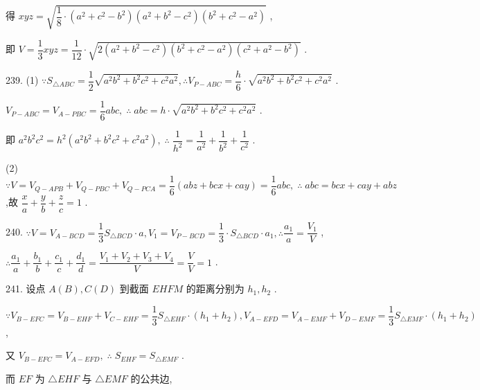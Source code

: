 得 ${xyz} = \sqrt{\dfrac{1}{8} \cdot  \left( {{a}^{2} + {c}^{2} - {b}^{2}}\right) \left( {{a}^{2} + {b}^{2} - {c}^{2}}\right) \left( {{b}^{2} + {c}^{2} - {a}^{2}}\right) }$ ,

即 $V = \dfrac{1}{3}{xyz} = \dfrac{1}{12} \cdot  \sqrt{2\left( {{a}^{2} + {b}^{2} - {c}^{2}}\right) \left( {{b}^{2} + {c}^{2} - {a}^{2}}\right) \left( {{c}^{2} + {a}^{2} - {b}^{2}}\right) }$ .

239. (1) $\because {S}_{\bigtriangleup {ABC}} = \dfrac{1}{2}\sqrt{{a}^{2}{b}^{2} + {b}^{2}{c}^{2} + {c}^{2}{a}^{2}},\therefore {V}_{P - {ABC}} = \dfrac{h}{6} \cdot  \sqrt{{a}^{2}{b}^{2} + {b}^{2}{c}^{2} + {c}^{2}{a}^{2}}$ .

${V}_{P - {ABC}} = {V}_{A - {PBC}} = \dfrac{1}{6}{abc},\;\therefore \;{abc} = h \cdot  \sqrt{{a}^{2}{b}^{2} + {b}^{2}{c}^{2} + {c}^{2}{a}^{2}}$ .

即 ${a}^{2}{b}^{2}{c}^{2} = {h}^{2}\left( {{a}^{2}{b}^{2} + {b}^{2}{c}^{2} + {c}^{2}{a}^{2}}\right) ,\;\therefore \;\dfrac{1}{{h}^{2}} = \dfrac{1}{{a}^{2}} + \dfrac{1}{{b}^{2}} + \dfrac{1}{{c}^{2}}$ .

(2) $\because V = {V}_{Q - {APB}} + {V}_{Q - {PBC}} + {V}_{Q - {PCA}} = \dfrac{1}{6}\left( {{abz} + {bcx} + {cay}}\right)  = \dfrac{1}{6}{abc},\;\therefore \;{abc} = {bcx} + {cay} + {abz}$ ,故 $\dfrac{x}{a} + \dfrac{y}{b} + \dfrac{z}{c} = 1$ .

240. $\because V = {V}_{A - {BCD}} = \dfrac{1}{3}{S}_{\bigtriangleup {BCD}} \cdot  a,{V}_{1} = {V}_{P - {BCD}} = \dfrac{1}{3} \cdot  {S}_{\bigtriangleup {BCD}} \cdot  {a}_{1},\therefore \dfrac{{a}_{1}}{a} = \dfrac{{V}_{1}}{V}$ ,

$\therefore \dfrac{{a}_{1}}{a} + \dfrac{{b}_{1}}{b} + \dfrac{{c}_{1}}{c} + \dfrac{{d}_{1}}{d} = \dfrac{{V}_{1} + {V}_{2} + {V}_{3} + {V}_{4}}{V} = \dfrac{V}{V} = 1$ .

241. 设点 $A\left( B\right) ,C\left( D\right)$ 到截面 ${EHFM}$ 的距离分别为 ${h}_{1},{h}_{2}$ .

$\because {V}_{B - {EFC}} = {V}_{B - {EHF}} + {V}_{C - {EHF}} = \dfrac{1}{3}{S}_{\bigtriangleup {EHF}} \cdot  \left( {{h}_{1} + {h}_{2}}\right) ,{V}_{A - {EFD}} = {V}_{A - {EMF}} + {V}_{D - {EMF}} = \dfrac{1}{3}{S}_{\bigtriangleup {EMF}} \cdot  \left( {{h}_{1} + {h}_{2}}\right)$ ,

又 ${V}_{B - {EFC}} = {V}_{A - {EFD}},\;\therefore \;{S}_{EHF} = {S}_{\bigtriangleup {EMF}}$ .

而 ${EF}$ 为 $\bigtriangleup {EHF}$ 与 $\bigtriangleup {EMF}$ 的公共边,

